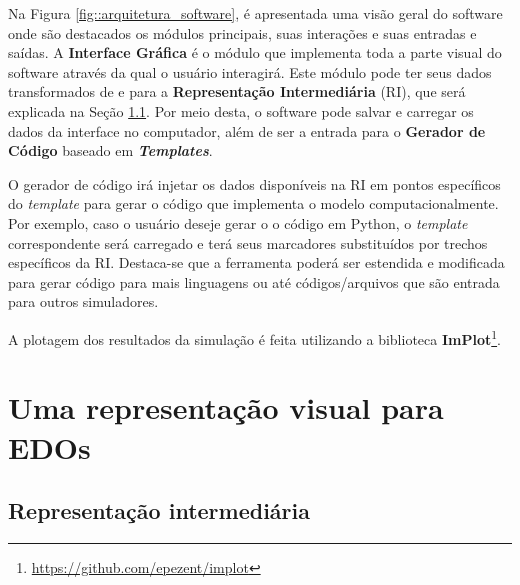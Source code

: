 \documentclass[
	12pt,				%
	openright,			%
	oneside,			%
	a4paper,			%
	main=brazil,
	english,			%
	]{ufsj-abntex2}
\begin{document}
Na Figura \ref{fig::arquitetura_software}, é apresentada uma visão geral do software onde são destacados os módulos principais, suas interações e suas entradas e saídas. A \textbf{Interface Gráfica} é o módulo que implementa toda a parte visual do software através da qual o usuário interagirá. Este módulo pode ter seus dados transformados de e para a \textbf{Representação Intermediária} (RI), que será explicada na Seção \ref{subsection:RI}. Por meio desta, o software pode salvar e carregar os dados da interface no computador, além de ser a entrada para o \textbf{Gerador de Código} baseado em \textbf{\textit{Templates}}.

O gerador de código irá injetar os dados disponíveis na RI em pontos específicos do \textit{template} para gerar o código que implementa o modelo computacionalmente. Por exemplo, caso o usuário deseje gerar o o código em Python, o \textit{template} correspondente será carregado e terá seus marcadores substituídos por trechos específicos da RI. Destaca-se que a ferramenta poderá ser estendida e modificada para gerar código para mais linguagens ou até códigos/arquivos que são entrada para outros simuladores. 


% 

A plotagem dos resultados da simulação é feita utilizando a biblioteca \textbf{ImPlot}\footnote{\href{https://github.com/epezent/implot}{https://github.com/epezent/implot}}.

\section{Uma representação visual para EDOs}
\label{sec:representacao-visual-edo}

\subsection{Representação intermediária}\label{subsection:RI}
\end{document}
